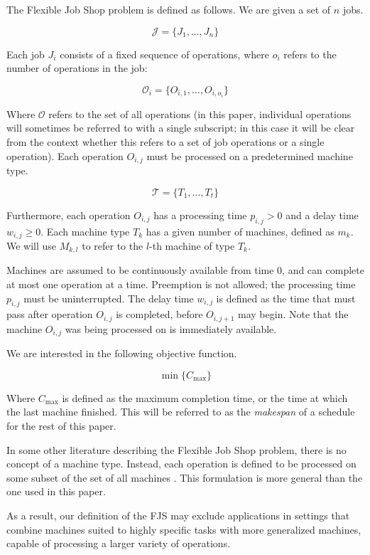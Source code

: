 \documentclass[a4paper,11pt]{article}
\begin{document}
The Flexible Job Shop problem is defined as follows. We are given a set of $n$ jobs.

\[ \mathcal{J} = \{J_1, \dots, J_n\} \]

Each job $J_i$ consists of a fixed sequence of operations, where $o_i$ refers to the number of operations in the job:

\[ \mathcal{O}_i = \{O_{i,1}, \dots, O_{i, o_i}\} \]

Where $\mathcal{O}$ refers to the set of all operations (in this paper, individual operations will sometimes be referred to with a single subscript; in this case it will be clear from the context whether this refers to a set of job operations or a single operation). Each operation $O_{i,j}$ must be processed on a predetermined machine type.

\[ \mathcal{T} = \{T_1, \dots, T_t\} \]

Furthermore, each operation $O_{i,j}$ has a processing time $p_{i,j} > 0$ and a delay time $w_{i,j} \geq 0$. Each machine type $T_k$ has a given number of machines, defined as $m_k$. We will use $M_{k,l}$ to refer to the $l$-th machine of type $T_k$.

Machines are assumed to be continuously available from time 0, and can complete at most one operation at a time. Preemption is not allowed; the processing time $p_{i,j}$ must be uninterrupted. The delay time $w_{i,j}$ is defined as the time that must pass after operation $O_{i,j}$ is completed, before $O_{i,j + 1}$ may begin. Note that the machine $O_{i,j}$ was being processed on is immediately available.

We are interested in the following objective function.

\[ \min \{ C_\text{max} \} \]

Where $C_\text{max}$ is defined as the maximum completion time, or the time at which the last machine finished. This will be referred to as the \emph{makespan} of a schedule for the rest of this paper.

In some other literature describing the Flexible Job Shop problem, there is no concept of a machine type. Instead, each operation is defined to be processed on some subset of the set of all machines \cite{approxfjsp, ls-fbjs}. This formulation is more general than the one used in this paper.

As a result, our definition of the FJS may exclude applications in settings that combine machines suited to highly specific tasks with more generalized machines, capable of processing a larger variety of operations.
\end{document}
